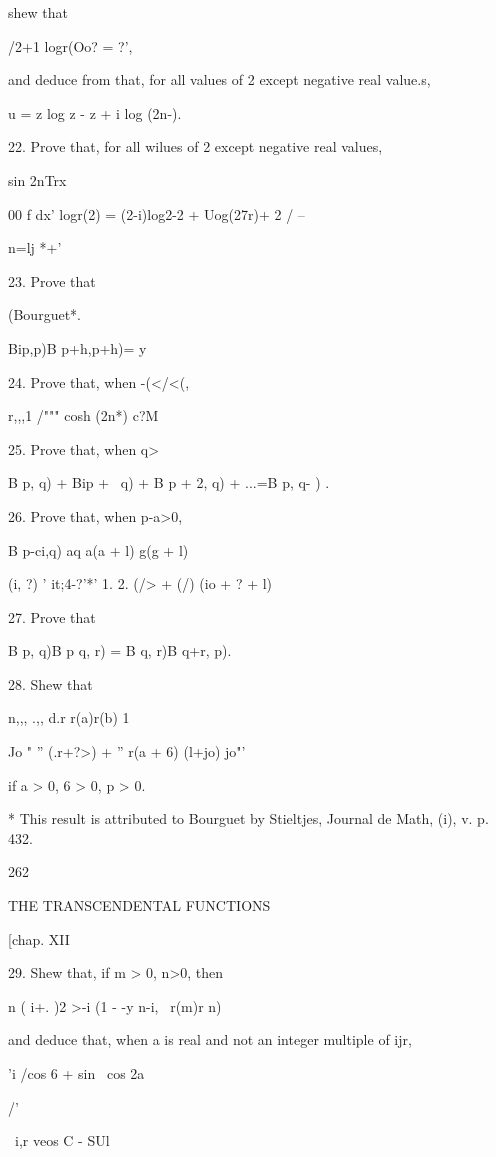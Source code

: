 shew that

/2+1 logr(Oo? = ?',

and deduce from that, for all values of 2 except negative real
value.s,

u = z log z - z + i log (2n-).


22. Prove that, for all wilues of 2 except negative real values,

sin 2nTrx

00 f dx' logr(2) = (2-i)log2-2 + Uog(27r)+ 2 / --

n=lj *+'

23. Prove that

(Bourguet*.

Bip,p)B p+h,p+h)= y 

24. Prove that, when -(</<(,

r,,,1 /""" cosh (2n*) c?M

25. Prove that, when q>\,

B p, q) + Bip + \, q) + B p + 2, q) + ...=B p, q- ) .

26. Prove that, when p-a>0,

B p-ci,q) aq a(a + l) g(g + l)

 (i, ?) ' it;4-?'*' 1. 2. (/> + (/) (io + ? + l)  

27. Prove that

B p, q)B p q, r) = B q, r)B q+r, p). 

28. Shew that

n,,, .,, d.r r(a)r(b) 1

Jo " '' (.r+?>) + '' r(a + 6) (l+jo) jo"'

if a > 0, 6 > 0, p > 0. 

* This result is attributed to Bourguet by Stieltjes, Journal de Math,
(i), v. p. 432.

262

THE TRANSCENDENTAL FUNCTIONS

[chap. XII

29. Shew that, if m > 0, n>0, then

n ( i+. )2 >-i (1 - -y n-i, \ r(m)r n)

and deduce that, when a is real and not an integer multiple of ijr,

'i /cos 6 + sin \ cos 2a

/'

\ i,r veos C - SUl

